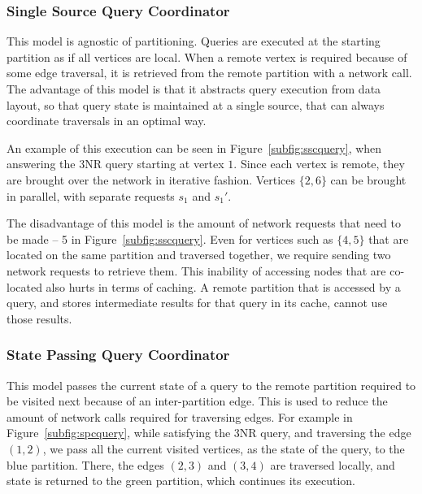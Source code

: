 \subsubsection{Single Source Query Coordinator}
\label{sec:singlesourcequerycoord}

This model is agnostic of partitioning. Queries are executed at the starting
partition as if all vertices are local. When a remote vertex is required because
of some edge traversal, it is retrieved from the remote partition with a network
call. The advantage of this model is that it abstracts query execution from data
layout, so that query state is maintained at a single source, that can always
coordinate traversals in an optimal way.

An example of this execution can be seen in Figure~\ref{subfig:sscquery}, when
answering the 3NR query starting at vertex $1$. Since each vertex is remote,
they are brought over the network in iterative fashion. Vertices $\{2, 6\}$ can
be brought in parallel, with separate requests $s_1$ and $s_1'$.

The disadvantage of this model is the amount of network requests that need
to be made -- 5 in Figure~\ref{subfig:sscquery}. Even for vertices such as
$\{4,5\}$ that are located on the same partition and traversed together, we
require sending two network requests to retrieve them. This inability of
accessing nodes that are co-located also hurts in terms of caching. A remote
partition that is accessed by a query, and stores intermediate results for that
query in its cache, cannot use those results.

\subsubsection{State Passing Query Coordinator}
\label{sec:statepassingquerycoord}

This model passes the current state of a query to the remote partition required
to be visited next because of an inter-partition edge. This is used to reduce
the amount of network calls required for traversing edges. For example in
Figure~\ref{subfig:spcquery}, while satisfying the 3NR query, and traversing the
edge $(1, 2)$, we pass all the current visited vertices, as the state of the
query, to the blue partition. There, the edges $(2, 3)$ and $(3, 4)$ are
traversed locally, and state is returned to the green partition, which continues
its execution.

